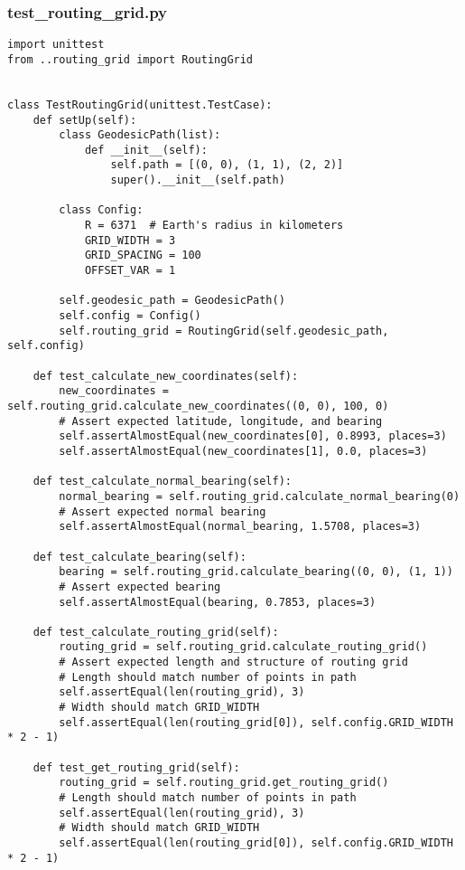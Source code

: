 \subsubsection{test_routing_grid.py}
\begin{verbatim}
import unittest
from ..routing_grid import RoutingGrid


class TestRoutingGrid(unittest.TestCase):
    def setUp(self):
        class GeodesicPath(list):
            def __init__(self):
                self.path = [(0, 0), (1, 1), (2, 2)]
                super().__init__(self.path)

        class Config:
            R = 6371  # Earth's radius in kilometers
            GRID_WIDTH = 3
            GRID_SPACING = 100
            OFFSET_VAR = 1

        self.geodesic_path = GeodesicPath()
        self.config = Config()
        self.routing_grid = RoutingGrid(self.geodesic_path, self.config)

    def test_calculate_new_coordinates(self):
        new_coordinates = self.routing_grid.calculate_new_coordinates((0, 0), 100, 0)
        # Assert expected latitude, longitude, and bearing
        self.assertAlmostEqual(new_coordinates[0], 0.8993, places=3)
        self.assertAlmostEqual(new_coordinates[1], 0.0, places=3)

    def test_calculate_normal_bearing(self):
        normal_bearing = self.routing_grid.calculate_normal_bearing(0)
        # Assert expected normal bearing
        self.assertAlmostEqual(normal_bearing, 1.5708, places=3)

    def test_calculate_bearing(self):
        bearing = self.routing_grid.calculate_bearing((0, 0), (1, 1))
        # Assert expected bearing
        self.assertAlmostEqual(bearing, 0.7853, places=3)

    def test_calculate_routing_grid(self):
        routing_grid = self.routing_grid.calculate_routing_grid()
        # Assert expected length and structure of routing grid
        # Length should match number of points in path
        self.assertEqual(len(routing_grid), 3)
        # Width should match GRID_WIDTH
        self.assertEqual(len(routing_grid[0]), self.config.GRID_WIDTH * 2 - 1)

    def test_get_routing_grid(self):
        routing_grid = self.routing_grid.get_routing_grid()
        # Length should match number of points in path
        self.assertEqual(len(routing_grid), 3)
        # Width should match GRID_WIDTH
        self.assertEqual(len(routing_grid[0]), self.config.GRID_WIDTH * 2 - 1)

\end{verbatim}
